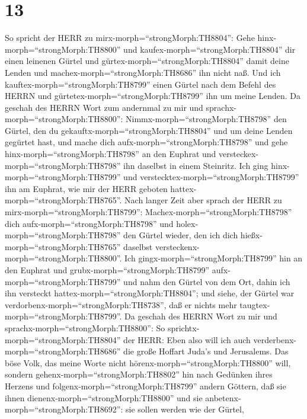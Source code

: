 \hypertarget{section-12}{%
\section{13}\label{section-12}}

 So spricht der HERR zu mirx-morph=``strongMorph:TH8804'':
Gehe hinx-morph=``strongMorph:TH8800'' und
kaufex-morph=``strongMorph:TH8804'' dir einen leinenen Gürtel und
gürtex-morph=``strongMorph:TH8804'' damit deine Lenden und
machex-morph=``strongMorph:TH8686'' ihn nicht naß.  Und ich
kauftex-morph=``strongMorph:TH8799'' einen Gürtel nach dem Befehl des
HERRN und gürtetex-morph=``strongMorph:TH8799'' ihn um meine Lenden.
 Da geschah des HERRN Wort zum andernmal zu mir und
sprachx-morph=``strongMorph:TH8800'': 
Nimmx-morph=``strongMorph:TH8798'' den Gürtel, den du
gekauftx-morph=``strongMorph:TH8804'' und um deine Lenden gegürtet hast,
und mache dich aufx-morph=``strongMorph:TH8798'' und gehe
hinx-morph=``strongMorph:TH8798'' an den Euphrat und
versteckex-morph=``strongMorph:TH8798'' ihn daselbst in einem Steinritz.
 Ich ging hinx-morph=``strongMorph:TH8799'' und
verstecktex-morph=``strongMorph:TH8799'' ihn am Euphrat, wie mir der
HERR geboten hattex-morph=``strongMorph:TH8765''.  Nach
langer Zeit aber sprach der HERR zu mirx-morph=``strongMorph:TH8799'':
Machex-morph=``strongMorph:TH8798'' dich
aufx-morph=``strongMorph:TH8798'' und holex-morph=``strongMorph:TH8798''
den Gürtel wieder, den ich dich hießx-morph=``strongMorph:TH8765''
daselbst versteckenx-morph=``strongMorph:TH8800''.  Ich
gingx-morph=``strongMorph:TH8799'' hin an den Euphrat und
grubx-morph=``strongMorph:TH8799'' aufx-morph=``strongMorph:TH8799'' und
nahm den Gürtel von dem Ort, dahin ich ihn versteckt
hattex-morph=``strongMorph:TH8804''; und siehe, der Gürtel war
verdorbenx-morph=``strongMorph:TH8738'', daß er nichts mehr
taugtex-morph=``strongMorph:TH8799''.  Da geschah des HERRN
Wort zu mir und sprachx-morph=``strongMorph:TH8800'':  So
sprichtx-morph=``strongMorph:TH8804'' der HERR: Eben also will ich auch
verderbenx-morph=``strongMorph:TH8686'' die große Hoffart Juda's und
Jerusalems.  Das böse Volk, das meine Worte nicht
hörenx-morph=``strongMorph:TH8800'' will, sondern
gehenx-morph=``strongMorph:TH8802'' hin nach Gedünken ihres Herzens und
folgenx-morph=``strongMorph:TH8799'' andern Göttern, daß sie ihnen
dienenx-morph=``strongMorph:TH8800'' und sie
anbetenx-morph=``strongMorph:TH8692'': sie sollen werden wie der Gürtel,
